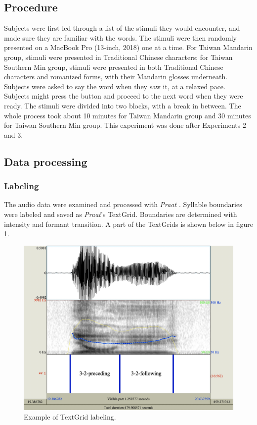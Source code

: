 \documentclass[12pt]{report}
\begin{document}
\begin{CJK}{UTF8}{bsmi}
\subsection{Procedure}
Subjects were first led through a list of the stimuli they would encounter, and made sure they are familiar with the words. The stimuli were then randomly presented on a MacBook Pro (13-inch, 2018) one at a time. For Taiwan Mandarin group, stimuli were presented in Traditional Chinese characters; for Taiwan Southern Min group, stimuli were presented in both Traditional Chinese characters and romanized forms, with their Mandarin glosses underneath. Subjects were asked to say the word when they saw it, at a relaxed pace. Subjects might press the button and proceed to the next word when they were ready. The stimuli were divided into two blocks, with a break in between. The whole process took about 10 minutes for Taiwan Mandarin group and 30 minutes for Taiwan Southern Min group. This experiment was done after Experiments 2 and 3.

\subsection{Data processing}
\subsubsection{Labeling}
The audio data were examined and processed with \textit{Praat} \citep{BoersmaWeenink2018}. Syllable boundaries were labeled and saved as \textit{Praat}’s TextGrid. Boundaries are determined with intensity and formant transition. A part of the TextGrids is shown below in figure \ref{Figure:TextGridExample}.

\begin{figure}[hbt!]
\centering
\includegraphics[width=\textwidth]{Figures/E1/TextGridExample.jpg}
\caption{Example of TextGrid labeling.}
\label{Figure:TextGridExample}
\end{figure}


\end{CJK}
\end{document}

